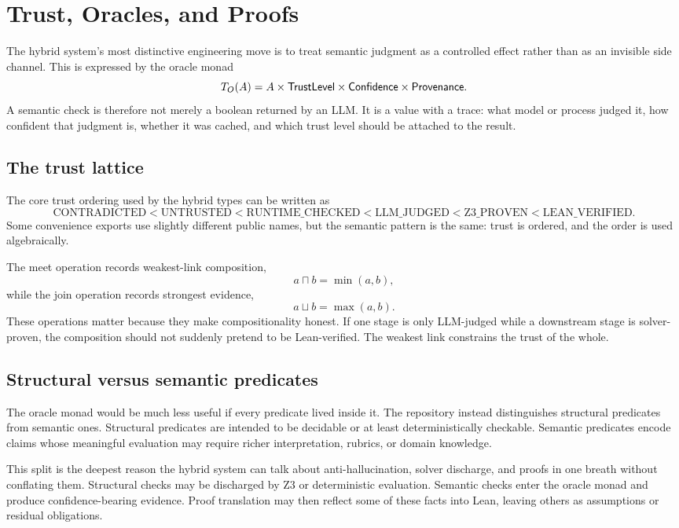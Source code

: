 \chapter{Trust, Oracles, and Proofs}

The hybrid system's most distinctive engineering move is to treat semantic judgment as a
controlled effect rather than as an invisible side channel. This is expressed by the
oracle monad
\[
  T_O(A) = A \times \mathsf{TrustLevel} \times \mathsf{Confidence} \times \mathsf{Provenance}.
\]
A semantic check is therefore not merely a boolean returned by an LLM. It is a value with
a trace: what model or process judged it, how confident that judgment is, whether it was
cached, and which trust level should be attached to the result.

\section*{The trust lattice}
The core trust ordering used by the hybrid types can be written as
\[
  \mathrm{CONTRADICTED} < \mathrm{UNTRUSTED} < \mathrm{RUNTIME\_CHECKED} < \mathrm{LLM\_JUDGED} < \mathrm{Z3\_PROVEN} < \mathrm{LEAN\_VERIFIED}.
\]
Some convenience exports use slightly different public names, but the semantic pattern is
the same: trust is ordered, and the order is used algebraically.

The meet operation records weakest-link composition,
\[
  a \sqcap b = \min(a,b),
\]
while the join operation records strongest evidence,
\[
  a \sqcup b = \max(a,b).
\]
These operations matter because they make compositionality honest. If one stage is only
LLM-judged while a downstream stage is solver-proven, the composition should not suddenly
pretend to be Lean-verified. The weakest link constrains the trust of the whole.

\section*{Structural versus semantic predicates}
The oracle monad would be much less useful if every predicate lived inside it. The
repository instead distinguishes structural predicates from semantic ones. Structural
predicates are intended to be decidable or at least deterministically checkable. Semantic
predicates encode claims whose meaningful evaluation may require richer interpretation,
rubrics, or domain knowledge.

This split is the deepest reason the hybrid system can talk about anti-hallucination,
solver discharge, and proofs in one breath without conflating them. Structural checks may
be discharged by Z3 or deterministic evaluation. Semantic checks enter the oracle monad
and produce confidence-bearing evidence. Proof translation may then reflect some of these
facts into Lean, leaving others as assumptions or residual obligations.

